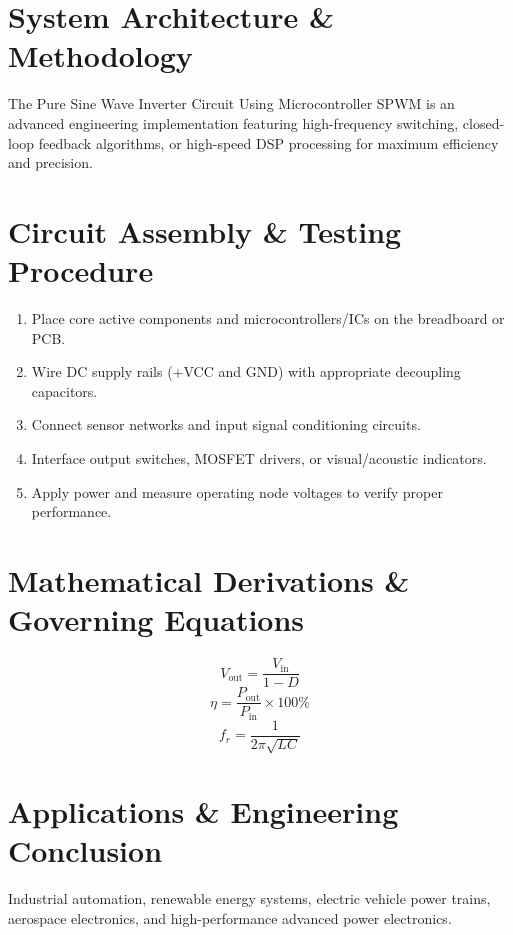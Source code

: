 \documentclass[11pt,a4paper]{article}
\begin{document}
\section{System Architecture \& Methodology}
The Pure Sine Wave Inverter Circuit Using Microcontroller SPWM is an advanced engineering implementation featuring high-frequency switching, closed-loop feedback algorithms, or high-speed DSP processing for maximum efficiency and precision.

\section{Circuit Assembly \& Testing Procedure}
\begin{enumerate}
    \item Place core active components and microcontrollers/ICs on the breadboard or PCB.
    \item Wire DC supply rails (+VCC and GND) with appropriate decoupling capacitors.
    \item Connect sensor networks and input signal conditioning circuits.
    \item Interface output switches, MOSFET drivers, or visual/acoustic indicators.
    \item Apply power and measure operating node voltages to verify proper performance.
\end{enumerate}

\section{Mathematical Derivations \& Governing Equations}
\begin{equation}
V_{\text{out}} = \frac{V_{\text{in}}}{1 - D}
\end{equation}
\begin{equation}
\eta = \frac{P_{\text{out}}}{P_{\text{in}}} \times 100\%
\end{equation}
\begin{equation}
f_r = \frac{1}{2\pi \sqrt{L C}}
\end{equation}

\section{Applications \& Engineering Conclusion}
Industrial automation, renewable energy systems, electric vehicle power trains, aerospace electronics, and high-performance advanced power electronics.
\end{document}
